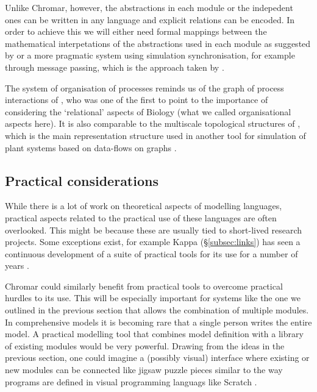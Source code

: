 \documentclass[phd]{infthesis}
\newcommand{\ssec}[1]{\S\ref{subsec:#1}}
\newcommand{\todo}[1]{\textcolor{red}{TODO: #1}}
\begin{document}
Unlike Chromar, however, the abstractions in each module or the indepedent ones
can be written in any language and explicit relations can be encoded. In order
to achieve this we will either need formal mappings between the mathematical
interpetations of the abstractions used in each module as suggested by
\citet{mjolsness_prospects_2018} or a more pragmatic system using simulation
synchronisation, for example through message passing, which is the approach
taken by \citet{cis_2018}.

The system of organisation of processes reminds us of the graph of process
interactions of \citet{rashevsky_topology_1954}, who was one of the first to
point to the importance of considering the `relational' aspects of Biology (what
we called organisational aspects here). It is also comparable to the multiscale
topological structures of \citet{godin_multiscale_1998}, which is the main
representation structure used in another tool for simulation of plant systems
based on data-flows on graphs \citep[OpenAlea;][]{pradal_openalea:_2008}.


\subsection{Practical considerations}
While there is a lot of work on theoretical aspects of modelling languages,
practical aspects related to the practical use of these languages are often
overlooked. This might be because these are usually tied to short-lived research
projects. Some exceptions exist, for example Kappa (\ssec{links}) has seen
a continuous development of a suite of practical tools for its use for a number
of years \citep[Kappa platform;][]{boutillier2018kappa}.

Chromar could similarly benefit from practical tools to overcome practical
hurdles to its use. This will be especially important for systems like the one
we outlined in the previous section that allows the combination of multiple
modules. In comprehensive models it is becoming rare that a single person writes
the entire model. A practical modelling tool that combines model definition with
a library of existing modules would be very powerful. Drawing from the ideas in
the previous section, one could imagine a (possibly visual) interface where
existing or new modules can be connected like jigsaw puzzle pieces similar to
the way programs are defined in visual programming languags like Scratch
\citep{maloney_scratch_2010}.
\end{document}
